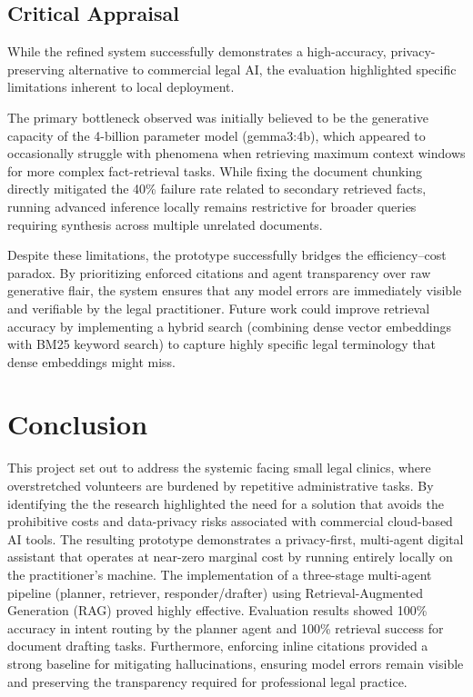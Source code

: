 \documentclass[11pt,a4paper]{article}
\begin{document}
\subsection{Critical Appraisal}

While the refined system successfully demonstrates a high-accuracy, privacy-preserving alternative to commercial legal AI, the evaluation highlighted specific limitations inherent to local deployment.

The primary bottleneck observed was initially believed to be the generative capacity of the 4-billion parameter model (gemma3:4b), which appeared to occasionally struggle with  phenomena when retrieving maximum context windows for more complex fact-retrieval tasks. While fixing the document chunking directly mitigated the 40\% failure rate related to secondary retrieved facts, running advanced inference locally remains restrictive for broader queries requiring synthesis across multiple unrelated documents.

Despite these limitations, the prototype successfully bridges the efficiency--cost paradox. By prioritizing enforced citations and agent transparency over raw generative flair, the system ensures that any model errors are immediately visible and verifiable by the legal practitioner. Future work could improve retrieval accuracy by implementing a hybrid search (combining dense vector embeddings with BM25 keyword search) to capture highly specific legal terminology that dense embeddings might miss.

\section{Conclusion}
\label{sec:conclusion}

This project set out to address the systemic  facing small legal clinics, where overstretched volunteers are burdened by repetitive administrative tasks. By identifying the  the research highlighted the need for a solution that avoids the prohibitive costs and data-privacy risks associated with commercial cloud-based AI tools. The resulting prototype demonstrates a privacy-first, multi-agent digital assistant that operates at near-zero marginal cost by running entirely locally on the practitioner's machine. The implementation of a three-stage multi-agent pipeline (planner, retriever, responder/drafter) using Retrieval-Augmented Generation (RAG) proved highly effective. Evaluation results showed 100\% accuracy in intent routing by the planner agent and 100\% retrieval success for document drafting tasks. Furthermore, enforcing inline citations provided a strong baseline for mitigating hallucinations, ensuring model errors remain visible and preserving the transparency required for professional legal practice.
\end{document}
